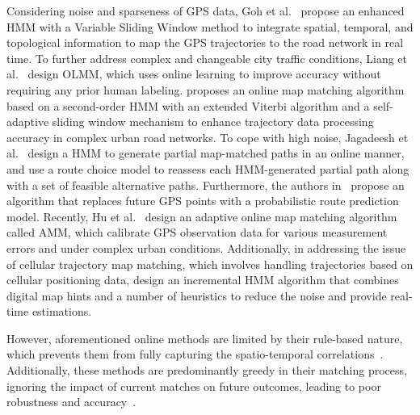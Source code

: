 Considering noise and sparseness of GPS data, Goh et al.~\cite{ohmm} propose an enhanced HMM with a Variable Sliding Window method to integrate spatial, temporal, and topological information to map the GPS trajectories to the road network in real time. 
To further address complex and changeable city traffic conditions, Liang et al.~\cite{onlinelearning} design OLMM, which uses online learning to improve accuracy without requiring any prior human labeling.
\cite{fu2021online} proposes an online map matching algorithm based on a second-order HMM with an extended Viterbi algorithm and a self-adaptive sliding window mechanism to enhance trajectory data processing accuracy in complex urban road networks.
To cope with high noise, Jagadeesh et al.~\cite{2017TITSonline} design a HMM to generate partial map-matched paths in an online manner, and use a route choice model to reassess each HMM-generated partial path along with a set of feasible alternative paths.
Furthermore, the authors in~\cite{routepre} propose an algorithm that replaces future GPS points with a probabilistic route prediction model.
Recently, Hu et al.~\cite{AMM} design an adaptive online map matching algorithm called AMM, which calibrate GPS observation data for various measurement errors and under complex urban conditions. 
Additionally, in addressing the issue of cellular trajectory map matching, which involves handling trajectories based on cellular positioning data, \cite{AccReal} design an incremental HMM algorithm that combines digital map hints and a number of heuristics to reduce the noise and provide real-time estimations. 

However, aforementioned online methods are limited by their rule-based nature, which prevents them from fully capturing the spatio-temporal correlations~\cite{hmmAna}. Additionally, these methods are predominantly greedy in their matching process, ignoring the impact of current matches on future outcomes, leading to poor robustness and accuracy~\cite{mmsurvey, surveyVMMT}.